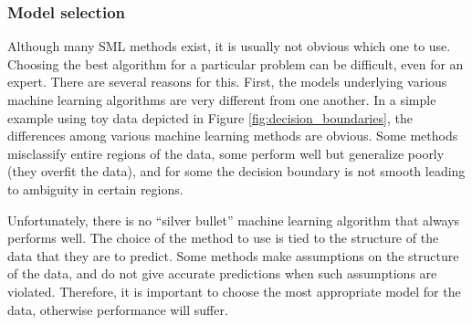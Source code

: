 

\subsubsection{Model selection}

Although many SML methods exist, it is usually not obvious which one to use. Choosing the best
algorithm for a particular problem can be difficult, even for an expert. There are several reasons
for this. First, the models underlying various machine learning algorithms are very different from
one another. In a simple example using toy data depicted in Figure \ref{fig:decision_boundaries}, the differences among 
various machine learning methods are obvious. Some methods misclassify entire regions of the data,
some perform well but generalize poorly (they overfit the data), and for some the decision boundary
is not smooth leading to ambiguity in certain regions.  

Unfortunately, there is no ``silver bullet'' machine learning algorithm that always performs well.  The choice of the method to use is tied to the structure of the data that they are to predict.  Some methods make assumptions on the
structure of the data, and do not give accurate predictions when such assumptions are violated. Therefore, it is important to choose the most appropriate model for the data, otherwise performance will suffer. 

